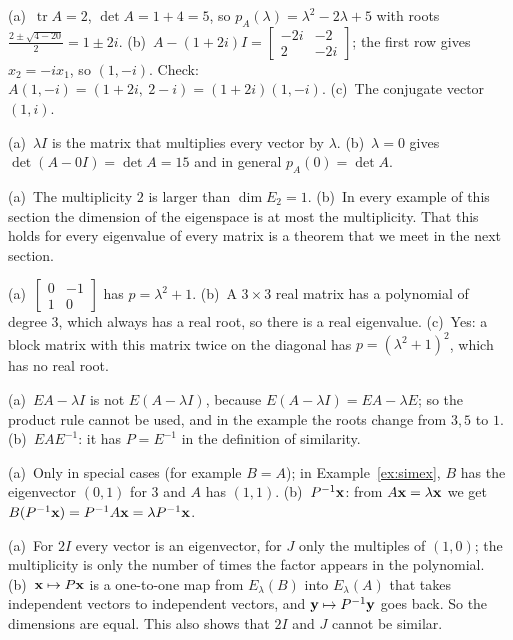 \documentclass[11pt]{article}
\begin{document}
\begin{description}[leftmargin=0pt,itemsep=5pt]
  \item[Knowledge Check \ref{kc:cplx}.] (a)~$\operatorname{tr}A=2$, $\det A=1+4=5$, so $p_A(\lambda)=\lambda^2-2\lambda+5$ with roots $\frac{2\pm\sqrt{4-20}}{2}=1\pm2i$. (b)~$A-(1+2i)I=\begin{bmatrix}-2i&-2\\2&-2i\end{bmatrix}$; the first row gives $x_2=-ix_1$, so $(1,-i)$. Check: $A(1,-i)=(1+2i,\ 2-i)=(1+2i)(1,-i)$. (c)~The conjugate vector $(1,i)$.
  \item[Pause and think \ref{think:lambdaI}.] (a)~$\lambda I$ is the matrix that multiplies every vector by $\lambda$. (b)~$\lambda=0$ gives $\det(A-0I)=\det A=15$ and in general $p_A(0)=\det A$.
  \item[Pause and think \ref{think:twonumbers}.] (a)~The multiplicity $2$ is larger than $\dim E_2=1$. (b)~In every example of this section the dimension of the eigenspace is at most the multiplicity. That this holds for every eigenvalue of every matrix is a theorem that we meet in the next section.
  \item[Pause and think \ref{think:odd}.] (a)~$\begin{bmatrix}0&-1\\1&0\end{bmatrix}$ has $p=\lambda^2+1$. (b)~A $3\times3$ real matrix has a polynomial of degree $3$, which always has a real root, so there is a real eigenvalue. (c)~Yes: a block matrix with this matrix twice on the diagonal has $p=(\lambda^2+1)^2$, which has no real root.
  \item[Pause and think \ref{think:rowops}.] (a)~$EA-\lambda I$ is not $E(A-\lambda I)$, because $E(A-\lambda I)=EA-\lambda E$; so the product rule cannot be used, and in the example the roots change from $3,5$ to $1$. (b)~$EAE^{-1}$: it has $P=E^{-1}$ in the definition of similarity.
  \item[Pause and think \ref{think:simev}.] (a)~Only in special cases (for example $B=A$); in Example~\ref{ex:simex}, $B$ has the eigenvector $(0,1)$ for $3$ and $A$ has $(1,1)$. (b)~$P^{-1}\mathbf{x}$: from $A\mathbf{x}=\lambda\mathbf{x}$ we get $B(P^{-1}\mathbf{x})=P^{-1}A\mathbf{x}=\lambda P^{-1}\mathbf{x}$.
  \item[Pause and think \ref{think:conv}.] (a)~For $2I$ every vector is an eigenvector, for $J$ only the multiples of $(1,0)$; the multiplicity is only the number of times the factor appears in the polynomial. (b)~$\mathbf{x}\mapsto P\mathbf{x}$ is a one-to-one map from $E_\lambda(B)$ into $E_\lambda(A)$ that takes independent vectors to independent vectors, and $\mathbf{y}\mapsto P^{-1}\mathbf{y}$ goes back. So the dimensions are equal. This also shows that $2I$ and $J$ cannot be similar.

\end{description}
\end{document}
